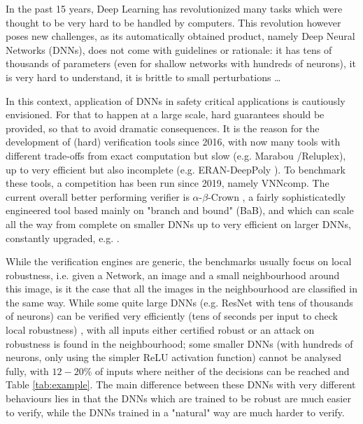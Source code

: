 In the past 15 years, Deep Learning has revolutionized many tasks which were thought to be very hard to be handled by computers. This revolution however poses new challenges, as its automatically obtained product, namely Deep Neural Networks (DNNs), does not come with guidelines or rationale: it has tens of thousands of parameters (even for shallow networks with hundreds of neurons), it is very hard to understand, it is brittle to small perturbations \cite{szegedy}\dots

In this context, application of DNNs in safety critical applications is cautiously envisioned. For that to happen at a large scale, hard guarantees should be provided, so that to avoid dramatic consequences. It is the reason for the development of (hard) verification tools since 2016, with now many tools with different trade-offs from exact computation but slow (e.g. Marabou \cite{katz2019marabou}/Reluplex\cite{Reluplex}), up to very efficient but also incomplete (e.g. ERAN-DeepPoly \cite{deeppoly}). To benchmark these tools, a competition has been run since 2019, namely VNNcomp. The current overall better performing verifier is $\alpha$-$\beta$-Crown \cite{crown}, a fairly sophisticatedly engineered tool based mainly on "branch and bound" (BaB), and which can scale all the way from complete on smaller DNNs \cite{xu2020fast} up to very efficient on larger DNNs, constantly upgraded, e.g. \cite{cutting}.

While the verification engines are generic, the benchmarks usually focus on local robustness, i.e. given a Network, an image and a small neighbourhood around this image, 
is it the case that all the images in the neighbourhood are classified in the same way.
While some quite large DNNs (e.g. ResNet with tens of thousands of neurons) can be verified very efficiently (tens of seconds per input to check local robustness) \cite{crown}, with all inputs either certified robust or an attack on robustness is found in the neighbourhood;
some smaller DNNs (with hundreds of neurons, only using the simpler ReLU activation function) cannot be analysed fully, with $12-20 \%$ of inputs where neither of the decisions can be reached \cite{crown} and Table \ref{tab:example}. The main difference between these DNNs with very different behaviours lies in that the DNNs which are trained to be robust are much easier to verify, while the DNNs trained in a "natural" way are much harder to verify.


